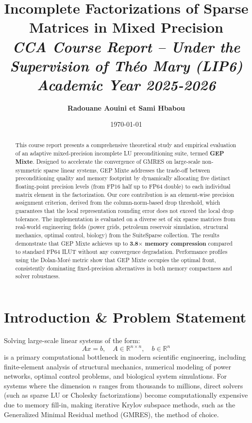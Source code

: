 \documentclass[11pt,a4paper]{article}
\title{\textbf{Incomplete Factorizations of Sparse Matrices in Mixed Precision}\\
\large\textit{CCA Course Report -- Under the Supervision of Théo Mary (LIP6)}\\
\large\textit{Academic Year 2025-2026}}
\author{\textbf{Radouane Aouini et Sami Hbabou}}
\date{\today}
\begin{document}
\maketitle

\begin{abstract}
This course report presents a comprehensive theoretical study and empirical evaluation of an adaptive mixed-precision incomplete LU preconditioning suite, termed \textbf{GEP Mixte}. Designed to accelerate the convergence of GMRES on large-scale non-symmetric sparse linear systems, GEP Mixte addresses the trade-off between preconditioning quality and memory footprint by dynamically allocating five distinct floating-point precision levels (from FP16 half up to FP64 double) to each individual matrix element in the factorization. Our core contribution is an element-wise precision assignment criterion, derived from the column-norm-based drop threshold, which guarantees that the local representation rounding error does not exceed the local drop tolerance. The implementation is evaluated on a diverse set of six sparse matrices from real-world engineering fields (power grids, petroleum reservoir simulation, structural mechanics, optimal control, biology) from the SuiteSparse collection. The results demonstrate that GEP Mixte achieves up to \textbf{3.8$\times$ memory compression} compared to standard FP64 ILUT without any convergence degradation. Performance profiles using the Dolan-Moré metric show that GEP Mixte occupies the optimal front, consistently dominating fixed-precision alternatives in both memory compactness and solver robustness.
\end{abstract}

\newpage
\tableofcontents
\newpage

\section{Introduction \& Problem Statement}

Solving large-scale linear systems of the form:
\begin{equation}
    Ax = b, \quad A \in \mathbb{R}^{n \times n}, \quad b \in \mathbb{R}^n
\end{equation}
is a primary computational bottleneck in modern scientific engineering, including finite-element analysis of structural mechanics, numerical modeling of power networks, optimal control problems, and biological system simulations. For systems where the dimension $n$ ranges from thousands to millions, direct solvers (such as sparse LU or Cholesky factorizations) become computationally expensive due to memory fill-in, making iterative Krylov subspace methods, such as the Generalized Minimal Residual method (GMRES), the method of choice.
\end{document}
